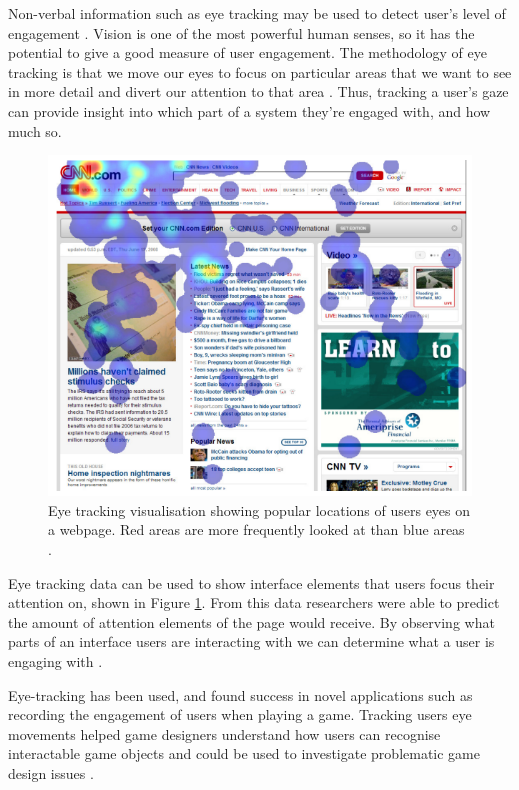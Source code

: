 \documentclass{article}
\begin{document}
Non-verbal information such as eye tracking may be used to detect user's level of engagement \cite{lala2017detection}.
Vision is one of the most powerful human senses, so it has the potential to give a good measure of user engagement. 
The methodology of eye tracking is that we move our eyes to focus on particular areas that we want to see in more detail and divert our attention to that area \cite{duchowski2007eye}. 
Thus, tracking a user's gaze can provide insight into which part of a system they're engaged with, and how much so.

\begin{figure}[ht!]
    \centering
    \centerline{
        \includegraphics[scale=0.6]{Images/EyeHeatmap.PNG}
    }
    \caption{Eye tracking visualisation showing popular locations of users eyes on a webpage. Red areas are more frequently looked at than blue areas \cite{buscher2009you}.}
    \label{fig:eyetrack}
\end{figure}

Eye tracking data can be used to show interface elements that users focus their attention on, shown in Figure \ref{fig:eyetrack}. 
From this data researchers were able to predict the amount of attention elements of the page would receive.
By observing what parts of an interface users are interacting with we can determine what a user is engaging with \cite{buscher2009you}.

Eye-tracking has been used, and found success in novel applications such as recording the engagement of users when playing a game. 
Tracking users eye movements helped game designers understand how users can recognise interactable game objects and could be used to investigate problematic game design issues \cite{renshaw2009towards}.
\end{document}
